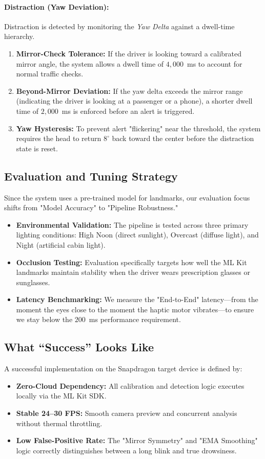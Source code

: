 \documentclass[11pt]{report}
\begin{document}
\paragraph{Distraction (Yaw Deviation):}
Distraction is detected by monitoring the \textit{Yaw Delta} against a dwell-time hierarchy.
\begin{enumerate}
    \item \textbf{Mirror-Check Tolerance:} If the driver is looking toward a calibrated mirror angle, the system allows a dwell time of $4{,}000$~ms to account for normal traffic checks.
    \item \textbf{Beyond-Mirror Deviation:} If the yaw delta exceeds the mirror range (indicating the driver is looking at a passenger or a phone), a shorter dwell time of $2{,}000$~ms is enforced before an alert is triggered.
    \item \textbf{Yaw Hysteresis:} To prevent alert "flickering" near the threshold, the system requires the head to return $8^\circ$ back toward the center before the distraction state is reset.
\end{enumerate}

\subsection{Evaluation and Tuning Strategy}
Since the system uses a pre-trained model for landmarks, our evaluation focus shifts from "Model Accuracy" to "Pipeline Robustness."

\begin{itemize}
    \item \textbf{Environmental Validation:} The pipeline is tested across three primary lighting conditions: High Noon (direct sunlight), Overcast (diffuse light), and Night (artificial cabin light).
    \item \textbf{Occlusion Testing:} Evaluation specifically targets how well the ML Kit landmarks maintain stability when the driver wears prescription glasses or sunglasses.
    \item \textbf{Latency Benchmarking:} We measure the "End-to-End" latency—from the moment the eyes close to the moment the haptic motor vibrates—to ensure we stay below the $200$~ms performance requirement.
\end{itemize}

\subsection{What ``Success'' Looks Like}
A successful implementation on the Snapdragon target device is defined by:
\begin{itemize}
    \item \textbf{Zero-Cloud Dependency:} All calibration and detection logic executes locally via the ML Kit SDK.
    \item \textbf{Stable 24--30 FPS:} Smooth camera preview and concurrent analysis without thermal throttling.
    \item \textbf{Low False-Positive Rate:} The "Mirror Symmetry" and "EMA Smoothing" logic correctly distinguishes between a long blink and true drowsiness.
\end{itemize}
\end{document}
